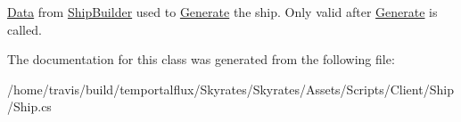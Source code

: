 \hyperlink{namespace_skyrates_1_1_client_1_1_data}{Data} from \hyperlink{class_skyrates_1_1_client_1_1_ship_1_1_ship_builder}{Ship\-Builder} used to \hyperlink{class_skyrates_1_1_client_1_1_ship_1_1_ship_a3a126b748f8c3265ab2d054c8c11ded7}{Generate} the ship. Only valid after \hyperlink{class_skyrates_1_1_client_1_1_ship_1_1_ship_a3a126b748f8c3265ab2d054c8c11ded7}{Generate} is called. 



The documentation for this class was generated from the following file\-:\begin{DoxyCompactItemize}
\item 
/home/travis/build/temportalflux/\-Skyrates/\-Skyrates/\-Assets/\-Scripts/\-Client/\-Ship/Ship.\-cs\end{DoxyCompactItemize}
